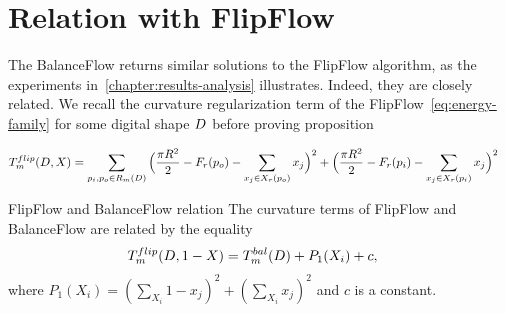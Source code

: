 \section{Relation with FlipFlow}
	The BalanceFlow returns similar solutions to the FlipFlow algorithm, as the experiments in~\cref{chapter:results-analysis} illustrates. Indeed, they are closely related. We recall the curvature regularization term of the FlipFlow~\cref{eq:energy-family} for some digital shape $D$ before proving proposition

\begin{align}
T_{m}^{flip}(D,X) &= \sum_{ p_i,p_o \in R_m(D)}{ \Big( \frac{\pi R^2}{2} - F_r(p_o) - \sum_{x_j \in X_r(p_o)}{x_j}\Big)^2 + \Big(\frac{\pi R^2}{2} - F_r(p_i) - \sum_{x_j \in X_r(p_i)}{x_j}\Big)^2 }
\label{eq:curvature-term}
\end{align}

\begin{proposition}{FlipFlow and BalanceFlow relation}
The curvature terms of FlipFlow and BalanceFlow are related by the equality
\begin{align*}
T_{m}^{flip}(D,1-X) &= T_{m}^{bal}(D) + P_1(X_i) + c,
\end{align*}
where $P_1(X_i) = (\sum_{X_i}{ 1-x_j})^2 + (\sum_{X_i}{x_j})^2$ and $c$ is a constant.
\label{prop:flipflow-balanceflow-relation}
\end{proposition}

